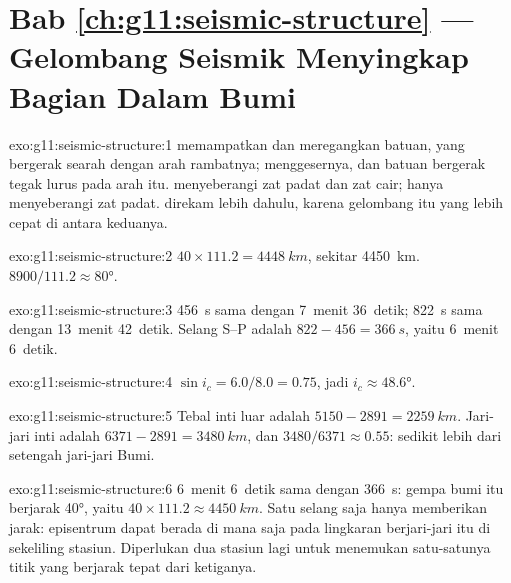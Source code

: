 \section*{Bab \ref{ch:g11:seismic-structure} --- Gelombang Seismik Menyingkap Bagian Dalam Bumi}

\begin{solution}{exo:g11:seismic-structure:1}
 memampatkan dan meregangkan batuan, yang bergerak searah dengan arah
rambatnya;  menggesernya, dan batuan bergerak tegak lurus pada arah
itu.  menyeberangi zat padat dan zat cair;  hanya
menyeberangi zat padat.  direkam lebih dahulu, karena gelombang itu
yang lebih cepat di antara keduanya.
\end{solution}

\begin{solution}{exo:g11:seismic-structure:2}
$40 \times 111.2 = \qty{4448}{km}$, sekitar \qty{4450}{km}. $8900/111.2
\approx \ang{80}$.
\end{solution}

\begin{solution}{exo:g11:seismic-structure:3}
\qty{456}{s} sama dengan 7~menit 36~detik; \qty{822}{s} sama dengan 13~menit
42~detik. Selang S--P adalah $822 - 456 = \qty{366}{s}$, yaitu 6~menit
6~detik.
\end{solution}

\begin{solution}{exo:g11:seismic-structure:4}
$\sin i_c = 6.0/8.0 = 0.75$, jadi $i_c \approx \ang{48.6}$.
\end{solution}

\begin{solution}{exo:g11:seismic-structure:5}
Tebal inti luar adalah $5150 - 2891 = \qty{2259}{km}$. Jari-jari inti adalah
$6371 - 2891 = \qty{3480}{km}$, dan $3480/6371 \approx 0.55$: sedikit lebih
dari setengah jari-jari Bumi.
\end{solution}

\begin{solution}{exo:g11:seismic-structure:6}
6~menit 6~detik sama dengan \qty{366}{s}: gempa bumi itu berjarak \ang{40}, yaitu
$40 \times 111.2 \approx \qty{4450}{km}$. Satu selang saja hanya memberikan
jarak: episentrum dapat berada di mana saja pada lingkaran berjari-jari itu di
sekeliling stasiun. Diperlukan dua stasiun lagi untuk menemukan satu-satunya
titik yang berjarak tepat dari ketiganya.
\end{solution}

